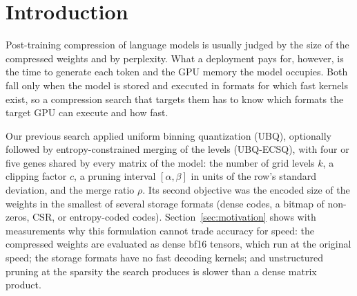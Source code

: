 \documentclass[11pt]{article}
\begin{document}
\begin{abstract}
and pruning with these formats and MLP width pruning, for the GPU time of an agent's turn at 32{,}000
tokens of context. Attention over the KV cache takes 66\% of that turn, so its time moves by at most
2.2\% below the uncompressed model. Sharing nearly halves the stored size at the lowest loss but barely
changes GPU memory. Making the KV cache a decision changes both. With keys quantized per channel, windows
that keep the first token, and recall of planted facts as a constraint, the search finds that windows are
safe only in the first and last quarter of the layers, for a $1.26\times$ faster turn at 0.01 nats and
$1.33\times$ at 0.1 nats, and that a quantized cache fits 491--854 agents on 80\,GB instead of 180. On 256 new
facts the fastest of these solutions recall every one. The times are predicted GPU times.
\end{abstract}

\tableofcontents

\section{Introduction}

Post-training compression of language models is usually judged by the size of the compressed weights
and by perplexity. What a deployment pays for, however, is the time to generate each token and the GPU
memory the model occupies. Both fall only when the model is stored and executed in formats for which
fast kernels exist, so a compression search that targets them has to know which formats the target GPU
can execute and how fast.

Our previous search applied uniform binning quantization (UBQ),
optionally followed by entropy-constrained merging of the levels (UBQ-ECSQ), with four or five genes
shared by every matrix of the model: the number of grid levels $k$, a clipping factor $c$, a pruning
interval $[\alpha,\beta]$ in units of the row's standard deviation, and the merge ratio $\rho$. Its
second objective was the encoded size of the weights in the smallest of several storage formats
(dense codes, a bitmap of non-zeros, CSR, or entropy-coded codes). Section~\ref{sec:motivation}
shows with measurements why this formulation cannot trade accuracy for speed: the compressed weights
are evaluated as dense bf16 tensors, which run at the original speed; the storage formats have no fast
decoding kernels; and unstructured pruning at the sparsity the search produces is slower than a dense
matrix product.
\end{document}
